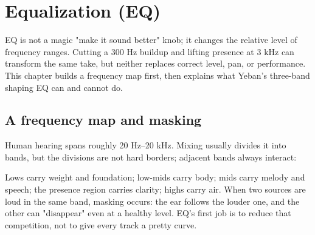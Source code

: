 \chapter{Equalization (EQ)}
\label{chap:eq}


EQ is not a magic "make it sound better" knob; it changes the relative level of frequency ranges. Cutting a 300 Hz buildup and lifting presence at 3 kHz can transform the same take, but neither replaces correct level, pan, or performance. This chapter builds a frequency map first, then explains what Yeban's three-band shaping EQ can and cannot do.

\section{A frequency map and masking}

Human hearing spans roughly 20 Hz–20 kHz. Mixing usually divides it into bands, but the divisions are not hard borders; adjacent bands always interact:

\begin{center}
\end{center}

Lows carry weight and foundation; low-mids carry body; mids carry melody and speech; the presence region carries clarity; highs carry air. When two sources are loud in the same band, masking occurs: the ear follows the louder one, and the other can "disappear" even at a healthy level. EQ's first job is to reduce that competition, not to give every track a pretty curve.


